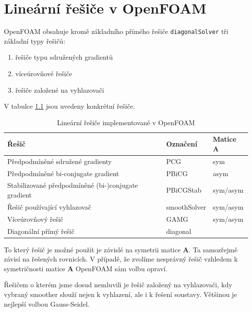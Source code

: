 \documentclass[a4paper,12pt]{report}
\theoremstyle{remark}
\begin{document}
	{\let\clearpage\relax \chapter{Lineární řešiče v OpenFOAM}}

OpenFOAM obsahuje kromě základního přímého řešiče \texttt{diagonalSolver} tři základní typy řešičů:
\begin{enumerate}
	\item řešiče typu sdružených gradientů 
	\item víceúrovňové řešiče
	\item řešiče založené na vyhlazovači

\end{enumerate}

V tabulce \ref{table:solvers} jsou uvedeny konkrétní řešiče.

\begin{table}[H]
	\centering
	\caption{Lineární řešiče implementované v OpenFOAM}
	\renewcommand{\arraystretch}{1.7}
	\begin{tabular}{*3l}
		\toprule
		\textbf{Řešič} & \textbf{Označení}&\textbf{Matice $\boldsymbol{A}$}\\
		\midrule
		{\small Předpodmíněné sdružené gradienty}& PCG& sym\\
		{\small Předpodmíněné bi-conjugate gradient}& PBiCG&asym \\		
		{\small Stabilizované předpodmíněné (bi-)conjugate gradient}& PBiCGStab&sym/asym  \\
		{\small Řešič používající vyhlazovač}& smoothSolver&sym/asym \\
		{\small Víceúrovňový řešič}& GAMG&sym/asym  \\
		{\small Diagonální přímý řešič}& 	diagonal \\
	
		\bottomrule
	\end{tabular}
	
	\label{table:solvers}
\end{table}
		
	To který řešič je možné použít je závislé na symetrii matice $\boldsymbol{A}$. Ta samozřejmě závisí na řešených rovnicích. V případě, že zvolíme nesprávný řešič vzhledem k symetričnosti matice $\boldsymbol{A}$ OpenFOAM sám volbu opraví.
	
	Řešičem o kterém jsme dosud nemluvili je řešič založený na vyhlazovači, kdy vybraný smoother slouží nejen k vyhlazení, ale i k řešení soustavy.  Většinou je nejlepší volbou Gauss-Seidel.
	
\end{document}

